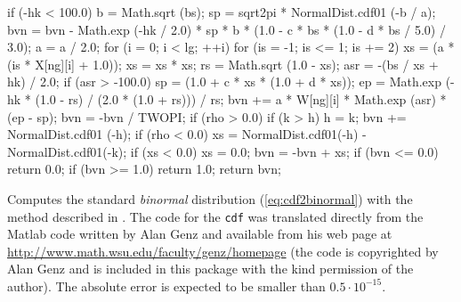 \begin{code}
\begin{hide}
{{{            if (-hk < 100.0) {
               b = Math.sqrt (bs);
               sp = sqrt2pi * NormalDist.cdf01 (-b / a);
               bvn = bvn - Math.exp (-hk / 2.0) * sp * b * (1.0 - c * bs * (1.0 -
                     d * bs / 5.0) / 3.0);
            }
            a = a / 2.0;
            for (i = 0; i < lg; ++i) {
               for (is = -1; is <= 1; is += 2) {
                  xs = (a * (is * X[ng][i] + 1.0));
                  xs = xs * xs;
                  rs = Math.sqrt (1.0 - xs);
                  asr = -(bs / xs + hk) / 2.0;
                  if (asr > -100.0) {
                     sp = (1.0 + c * xs * (1.0 + d * xs));
                     ep = Math.exp (-hk * (1.0 - rs) / (2.0 * (1.0 + rs))) / rs;
                     bvn += a * W[ng][i] * Math.exp (asr) * (ep - sp);
                  }
               }
            }
            bvn = -bvn / TWOPI;
         }
         if (rho > 0.0) {
            if (k > h)
               h = k;
            bvn += NormalDist.cdf01 (-h);
         }
         if (rho < 0.0) {
            xs = NormalDist.cdf01(-h) - NormalDist.cdf01(-k);
            if (xs < 0.0)
               xs = 0.0;
            bvn = -bvn + xs;
         }
      }
   if (bvn <= 0.0)
      return 0.0;
   if (bvn >= 1.0)
      return 1.0;
   return bvn;

   }\end{hide}
\end{code}
\begin{tabb}
     Computes the standard {\em binormal\/} distribution (\ref{eq:cdf2binormal})
   with the method described in \cite{tGEN04a}. The code for the \texttt{cdf} 
  was translated directly from the Matlab code written by Alan Genz
  and available from his web page at
  \url{http://www.math.wsu.edu/faculty/genz/homepage}
   (the code is copyrighted by Alan Genz 
  and is included in this package with the kind permission of the author).
   The absolute error is expected to be smaller  than $0.5 \cdot 10^{-15}$.  
 \end{tabb}
